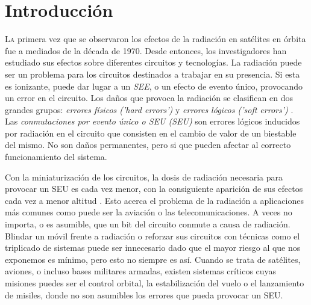 \chapter{Introducción}
\label{ch:Introduccion}

\lettrine[lraise=-0.1, lines=2, loversize=0.2]{L}{a} primera vez que se observaron
los efectos de la radiación en satélites en órbita fue a mediados de la década de
1970. Desde entonces, los investigadores han estudiado sus efectos sobre
diferentes circuitos y tecnologías. La radiación puede ser un problema para los
circuitos destinados a trabajar en su presencia. Si esta es ionizante, puede dar
lugar a un \textit{\gls{SEE}}, o un efecto de evento único, provocando un error 
en el circuito. Los daños que provoca la radiación se clasifican en dos grandes 
grupos: \textit{errores físicos ('hard errors')} y \textit{errores lógicos ('soft
errors')} \cite{TesisPoli}. Las \textit{conmutaciones por evento único o 
\acrlong{SEU} (\acrshort{SEU})} son errores lógicos inducidos por radiación en el 
circuito que consisten en el cambio de valor de un biestable del mismo. No son 
daños permanentes, pero si que pueden afectar al correcto funcionamiento del 
sistema.

Con la miniaturización de los circuitos, la dosis de radiación necesaria para 
provocar un \gls{SEU} es cada vez menor, con la consiguiente aparición de sus 
efectos cada vez a menor altitud \cite{EDN}. Esto acerca el problema de la 
radiación a aplicaciones más comunes como puede ser la aviación o las 
telecomunicaciones. A veces no importa, o es asumible, que un bit del circuito 
conmute a causa de radiación. Blindar un móvil frente a radiación o reforzar sus
circuitos con técnicas como el triplicado de sistemas puede ser innecesario dado
que el mayor riesgo al que nos exponemos es mínimo, pero esto no siempre es así.
Cuando se trata de satélites, aviones, o incluso bases militares armadas, existen
sistemas críticos cuyas misiones puedes ser el control orbital, la estabilización
del vuelo o el lanzamiento de misiles, donde no son asumibles los errores que
pueda provocar un \gls{SEU}.

